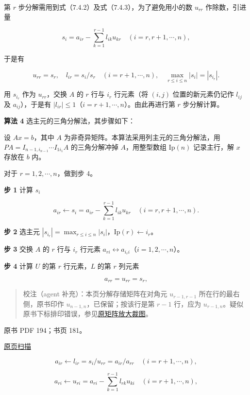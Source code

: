 \documentclass[
  10pt,
  fontset=fandol]{ctexart}
\begin{document}
第 \(r\) 步分解需用到式（7.4.2）及式（7.4.3），为了避免用小的数 \(u_{rr}\) 作除数，引进量

\[s_i=a_{ir}-\sum_{k=1}^{r-1}l_{ik}u_{kr}\quad(i=r,r+1,\cdots,n),\]

于是有

\[u_{rr}=s_r,\quad l_{ir}=s_i/s_r\quad(i=r+1,\cdots,n),\quad \max_{r\le i\le n}|s_i|=|s_{i_r}|.\]

用 \(s_{i_r}\) 作为 \(u_{rr}\)，交换 \(A\) 的 \(r\) 行与 \(i_r\) 行元素（将 \((i,j)\) 位置的新元素仍记作 \(l_{ij}\) 及 \(a_{ij}\)），于是有 \(|l_{ir}|\le1\)（\(i=r+1,\cdots,n\)）。由此再进行第 \(r\) 步分解计算。

\textbf{算法 4} 选主元的三角分解法，其步骤如下：

设 \(Ax=b\)，其中 \(A\) 为非奇异矩阵。本算法采用列主元的三角分解法，用 \(PA=I_{n-1,i_{n-1}}\cdots I_{1i_1}A\) 的三角分解冲掉 \(A\)，用整型数组 \(\mathrm{Ip}(n)\) 记录主行，解 \(x\) 存放在 \(b\) 内。

对于 \(r=1,2,\cdots,n\)，做到步 4。

\textbf{步 1} 计算 \(s_i\)

\[a_{ir}\leftarrow s_i=a_{ir}-\sum_{k=1}^{r-1}l_{ik}u_{kr}\quad(i=r,r+1,\cdots,n).\]

\textbf{步 2} 选主元 \(|s_{i_r}|=\max_{r\le i\le n}|s_i|\)，\(\mathrm{Ip}(r)\leftarrow i_r\)。

\textbf{步 3} 交换 \(A\) 的 \(r\) 行与 \(i_r\) 行元素 \(a_{ri}\leftrightarrow a_{i_ri}\)（\(i=1,2,\cdots,n\)）。

\textbf{步 4} 计算 \(U\) 的第 \(r\) 行元素，\(L\) 的第 \(r\) 列元素

\[a_{rr}=u_{rr}=s_r,\]

\begin{quote}
校注（agent 补充）：本页分解存储矩阵在对角元 \(u_{r-1,r-1}\) 所在行的最右侧，原书印作 \(u_{n-1,n}\)，已保留；按该行是第 \(r-1\) 行，应为 \(u_{r-1,n}\)。疑似原书下标排印错误，参见\href{/Users/xiangjunfeng/Desktop/数值计算专用/numerical-analysis/book/staging/ch07a/assets/pdf-193-storage-detail.png}{原矩阵放大裁图}。
\end{quote}

\clearpage

原书 PDF 194；书页 181。

\href{/Users/xiangjunfeng/Desktop/数值计算专用/numerical-analysis/book/source-images/pdf-194.jpeg}{原页扫描}

\[a_{ir}\leftarrow l_{ir}=s_i/u_{rr}=a_{ir}/a_{rr}\quad(i=r+1,\cdots,n),\]

\[a_{ri}\leftarrow u_{ri}=a_{ri}-\sum_{k=1}^{r-1}l_{rk}u_{ki}\quad(i=r+1,\cdots,n),\]
\end{document}
